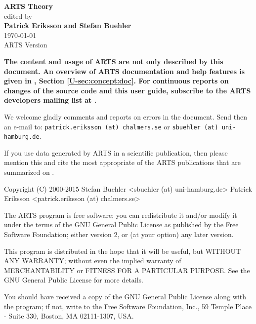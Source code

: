 \documentclass[11pt,twoside,a4paper,fleqn]{book}
\begin{document}
%
\renewcommand{\thepage}{title \arabic{page}} 

\thispagestyle{plain}
\begin{center}
  \vspace*{1cm}
  {\Huge \bf ARTS Theory\\}
  \vspace*{1cm}
  {\large edited by \\}
  \vspace*{1cm}
  {\Large \bf Patrick Eriksson and Stefan Buehler }\\
   \vspace*{2cm}
   {\large \today\\
    ARTS Version 
   }
\end{center}
\vspace*{\fill}
{\normalsize \bf
  \noindent
  The content and usage of ARTS are not only described by this
  document. An overview of ARTS documentation and help features is
  given in \user, Section \ref{U-sec:concept:doc}. For continuous reports on
  changes of the source code and this user guide, subscribe to the
  ARTS developers mailing list at .

  We welcome gladly comments and reports on errors in the document.
  Send then an e-mail to: \verb|patrick.eriksson (at) chalmers.se| or 
  \verb|sbuehler (at) uni-hamburg.de|.

  If you use data generated by ARTS in a scientific
  publication, then please mention this and cite the most
  appropriate of the ARTS publications that are summarized on
  .
}

\newpage                          
\thispagestyle{empty}
\vspace*{\fill}
\noindent
\begin{code}
Copyright (C) 2000-2015
Stefan Buehler <sbuehler (at) uni-hamburg.de>
Patrick Eriksson <patrick.eriksson (at) chalmers.se>

The ARTS program is free software; you can redistribute it
and/or modify it under the terms of the GNU General Public
License as published by the Free Software Foundation; either
version 2, or (at your option) any later version.

This program is distributed in the hope that it will be
useful, but WITHOUT ANY WARRANTY; without even the implied
warranty of MERCHANTABILITY or FITNESS FOR A PARTICULAR
PURPOSE. See the GNU General Public License for more
details. 

You should have received a copy of the GNU General Public
License along with the program; if not, write to the Free
Software Foundation, Inc., 59 Temple Place - Suite 330,
Boston, MA 02111-1307, USA. 
\end{code}
\end{document}
